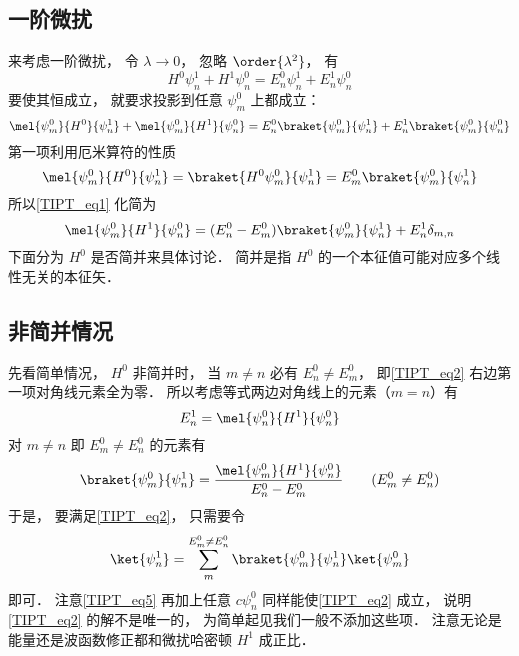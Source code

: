 \subsection{一阶微扰}
来考虑一阶微扰， 令 $\lambda \to 0$， 忽略 $\order{\lambda^2}$， 有
\begin{equation}
H^0\psi_n^1 + H^1 \psi_n^0 = E_n^0 \psi_n^1 + E_n^1 \psi_n^0
\end{equation}
要使其恒成立， 就要求投影到任意 $\psi_m^0$ 上都成立：
\begin{equation}\label{TIPT_eq1}
\mel{\psi_m^0}{H^0}{\psi_n^1} + \mel{\psi_m^0}{H^1}{\psi_n^0} = E_n^0 \braket{\psi_m^0}{\psi_n^1} + E_n^1 \braket{\psi_m^0}{\psi_n^0}
\end{equation}
第一项利用厄米算符的性质
\begin{equation}
\mel{\psi_m^0}{H^0}{\psi_n^1} = \braket{H^0\psi_m^0}{\psi_n^1} = E_m^0\braket{\psi_m^0}{\psi_n^1}
\end{equation}
所以\autoref{TIPT_eq1} 化简为
\begin{equation}\label{TIPT_eq2}
\mel{\psi_m^0}{H^1}{\psi_n^0} = (E_n^0 - E_m^0) \braket{\psi_m^0}{\psi_n^1} + E_n^1 \delta_{m,n}
\end{equation}
下面分为 $H^0$ 是否简并来具体讨论． 简并是指 $H^0$ 的一个本征值可能对应多个线性无关的本征矢．

\subsection{非简并情况}
先看简单情况， $H^0$ 非简并时， 当 $m\ne n$ 必有 $E_n^0 \ne E_m^0$， 即\autoref{TIPT_eq2} 右边第一项对角线元素全为零． 所以考虑等式两边对角线上的元素（$m = n$）有
\begin{equation}\label{TIPT_eq6}
E_n^1 = \mel{\psi_n^0}{H^1}{\psi_n^0}
\end{equation}
对 $m \ne n$ 即 $E_m^0 \ne E_n^0$ 的元素有
\begin{equation}\label{TIPT_eq4}
\braket{\psi_m^0}{\psi_n^1} = \frac{\mel{\psi_m^0}{H^1}{\psi_n^0}}{E_n^0 - E_m^0} \qquad (E_m^0 \ne E_n^0)
\end{equation}
于是， 要满足\autoref{TIPT_eq2}， 只需要令
\begin{equation}\label{TIPT_eq5}
\ket{\psi_n^1} = \sum_m^{E_m^0 \ne E_n^0} \braket{\psi_m^0}{\psi_n^1} \ket{\psi_m^0}
\end{equation}
即可． 注意\autoref{TIPT_eq5} 再加上任意 $c \psi_n^0$ 同样能使\autoref{TIPT_eq2} 成立， 说明\autoref{TIPT_eq2} 的解不是唯一的， 为简单起见我们一般不添加这些项． 注意无论是能量还是波函数修正都和微扰哈密顿 $H^1$ 成正比．

